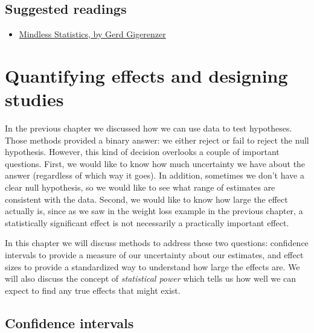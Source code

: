 \documentclass[12pt,]{book}
\providecommand{\tightlist}{%
  \setlength{\itemsep}{0pt}\setlength{\parskip}{0pt}}
\theoremstyle{definition}
\theoremstyle{definition}
\theoremstyle{definition}
\theoremstyle{remark}
\begin{document}
\hypertarget{suggested-readings-6}{%
\section{Suggested readings}\label{suggested-readings-6}}

\begin{itemize}
\tightlist
\item
  \href{https://library.mpib-berlin.mpg.de/ft/gg/GG_Mindless_2004.pdf}{Mindless Statistics, by Gerd Gigerenzer}
\end{itemize}

\hypertarget{ci-effect-size-power}{%
\chapter{Quantifying effects and designing studies}\label{ci-effect-size-power}}

In the previous chapter we discussed how we can use data to test hypotheses. Those methods provided a binary answer: we either reject or fail to reject the null hypothesis. However, this kind of decision overlooks a couple of important questions. First, we would like to know how much uncertainty we have about the answer (regardless of which way it goes). In addition, sometimes we don't have a clear null hypothesis, so we would like to see what range of estimates are consistent with the data. Second, we would like to know how large the effect actually is, since as we saw in the weight loss example in the previous chapter, a statistically significant effect is not necessarily a practically important effect.

In this chapter we will discuss methods to address these two questions: confidence intervals to provide a measure of our uncertainty about our estimates, and effect sizes to provide a standardized way to understand how large the effects are. We will also discuss the concept of \emph{statistical power} which tells us how well we can expect to find any true effects that might exist.

\hypertarget{confidence-intervals}{%
\section{Confidence intervals}\label{confidence-intervals}}
\end{document}
